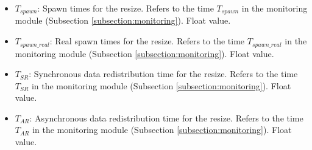 \begin{itemize}
\begin{itemize}
        \item $T_{spawn}$: Spawn times for the resize. Refers to the time $T_{spawn}$ in the monitoring module (Subsection \ref{subsection:monitoring}). Float value.
        \item $T_{spawn\_real}$: Real spawn times for the resize. Refers to the time $T_{spawn\_real}$ in the monitoring module (Subsection \ref{subsection:monitoring}). Float value.
        \item $T_{SR}$: Synchronous data redistribution time for the resize. Refers to the time $T_{SR}$ in the monitoring module (Subsection \ref{subsection:monitoring}). Float value.
        \item $T_{AR}$: Asynchronous data redistribution time for the resize. Refers to the time $T_{AR}$ in the monitoring module (Subsection \ref{subsection:monitoring}). Float value.
    \end{itemize}
\end{itemize}

